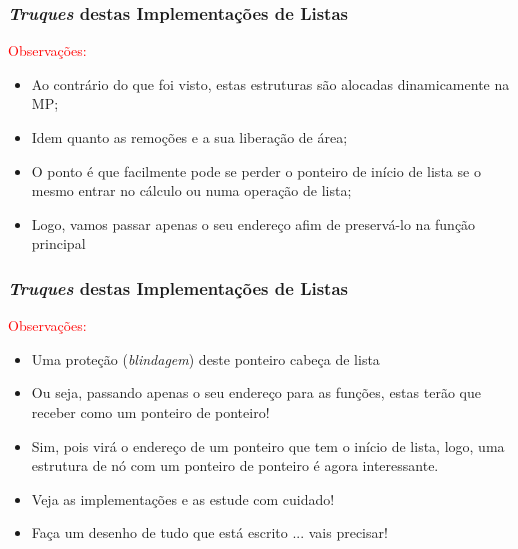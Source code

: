 
\begin{frame}%
\frametitle{\textit{Truques}  destas Implementações de Listas}


\begin{block}{\textcolor{red}{Observações:}}

\begin{itemize}
  \item Ao contrário do que foi visto, estas estruturas são alocadas
  dinamicamente na MP;
  \item Idem quanto as remoções e a sua liberação de área;
  \item O ponto é que facilmente pode se perder o ponteiro de início de lista
  se o mesmo entrar no cálculo ou numa operação de lista;
  \item Logo, vamos passar apenas o seu endereço afim de preservá-lo na função   principal
    
\end{itemize}
\end{block}

\end{frame} 

\begin{frame}%
\frametitle{\textit{Truques}  destas Implementações de Listas}

\begin{block}{\textcolor{red}{Observações:}}

\begin{itemize}
   \item Uma proteção (\textit{blindagem}) deste ponteiro cabeça de lista
   \item Ou seja, passando apenas o seu endereço para as funções, estas terão que receber
   como um ponteiro de ponteiro!
   \item Sim, pois virá o endereço de um ponteiro que tem o início de lista, logo,
 uma estrutura de nó com um   ponteiro de ponteiro é agora interessante.
 \item Veja as implementações  e as estude com cuidado!
 
 \item Faça um desenho de tudo que está escrito ... vais precisar!
    
\end{itemize}
\end{block}

\end{frame} 

